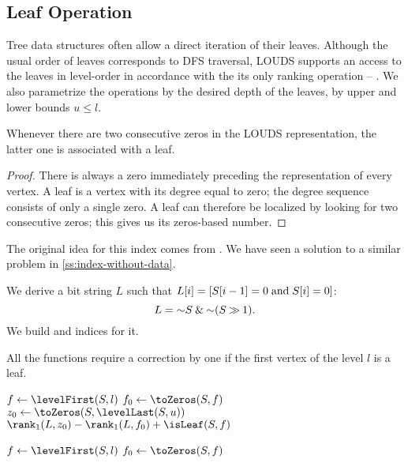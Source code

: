 \subsection{\label{ss:leaf-queries}Leaf Operation}

Tree data structures often allow a direct iteration of their leaves.
Although the usual order of leaves corresponds to DFS traversal, LOUDS supports an access to the leaves in level-order in accordance with the its only ranking operation -- \loRank{}.
We also parametrize the operations by the desired depth of the leaves, by upper and lower bounds $u \le l$.

\begin{lemma}
	Whenever there are two consecutive zeros in the LOUDS representation, the latter one is associated with a leaf.
\end{lemma}
\begin{proof}
	There is always a zero immediately preceding the representation of every vertex.
	A leaf is a vertex with its degree equal to zero; the degree sequence consists of only a single zero.
	A leaf can therefore be localized by looking for two consecutive zeros; this gives us its zeros-based number.
\end{proof}

The original idea for this index comes from \cite{munro1998space}.
We have seen a solution to a similar problem in \ref{ss:index-without-data}.

We derive a bit string $L$ such that $L[i] = [S[i - 1] = 0 \mathrel{\textrm{and}} S[i] = 0]$:
$$ L = \mathord{\sim} S \mathbin{\&} \mathord{\sim} (S \mathbin{\gg} 1). $$
We build \rank{} and \select{} indices for it.

All the functions require a correction by one if the first vertex of the level $l$ is a leaf.

\begin{algorithm}
\begin{algorithmic}
	\State $f \gets \levelFirst(S, l)$ 
	\State $f_0 \gets \toZeros(S, f)$
	\State $z_0 \gets \toZeros(S, \levelLast(S, u))$
	\State \Return $\rank_1(L, z_0) - \rank_1(L, f_0) + \isLeaf(S, f)$
\EndFunction
\end{algorithmic}
\end{algorithm}

\begin{algorithm}
\begin{algorithmic}	
 
	\State $f \gets \levelFirst(S, l)$ 
	\State $f_0 \gets \toZeros(S, f)$
	\State {}
\EndFunction
\end{algorithmic}
\end{algorithm}

